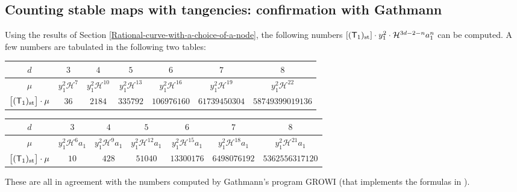 \documentclass[pdftex]{sigma}
\numberwithin{equation}{section}
\begin{document}
\subsection{Counting stable maps with tangencies: confirmation with Gathmann}\label{low_deg_st_map}

Using the results of Section \ref{Rational-curve-with-a-choice-of-a-node}, the
following numbers
$
[(\mathsf{T}_1)_{\textnormal{st}}]\cdot y_1^2 \cdot \mathcal{H}^{3d-2-n} a_1^{n}
$
can be computed. A few numbers are tabulated in the following two tables:
\begin{center}\renewcommand{\arraystretch}{1.2}
\begin{tabular}{|c|c|c|c|c|c|c|}
\hline
$d$ & $3$ & $4$ & $5$ & $6$ & $7$ & $8$ \\
\hline
$\mu$ & $y_1^2 \mathcal{H}^7$ & $y_1^2 \mathcal{H}^{10}$ & $y_1^2 \mathcal{H}^{13}$ & $y_1^2 \mathcal{H}^{16}$ &
$y_1^2 \mathcal{H}^{19}$ & $y_1^2 \mathcal{H}^{22}$ \\
\hline
$\bigl[(\mathsf{T}_1)_{\textnormal{st}}\bigr] \cdot \mu$ & $36$ & $2184$ & $335792$ & $106976160$ & $61739450304$
& $58749399019136$ \\
\hline
\end{tabular}
 \label{IRCAA_tab5}
\end{center}
\begin{center}\renewcommand{\arraystretch}{1.2}
\begin{tabular}{|c|c|c|c|c|c|c|}
\hline
$d$ & $3$ & $4$ & $5$ & $6$ & $7$ & $8$ \\
\hline
$\mu$ & $y_1^2 \mathcal{H}^6 a_1$ & $y_1^2 \mathcal{H}^{9}a_1$ & $y_1^2 \mathcal{H}^{12}a_1$ & $y_1^2 \mathcal{H}^{15}a_1$ &
$y_1^2 \mathcal{H}^{18}a_1$ & $y_1^2 \mathcal{H}^{21}a_1$ \\
\hline
$\bigl[(\mathsf{T}_1)_{\textnormal{st}}\bigr] \cdot \mu$ & $10$ & $428$ & $51040$ & $13300176$ & $6498076192$
& $5362556317120$ \\
\hline
\end{tabular}
 \label{IRCAA_tab6}
\end{center}
These are all in agreement with the numbers computed by Gathmann's
program GROWI
(that implements the formulas in \cite{AnGaPhD,AnGa1,AnGa2}).
\end{document}

